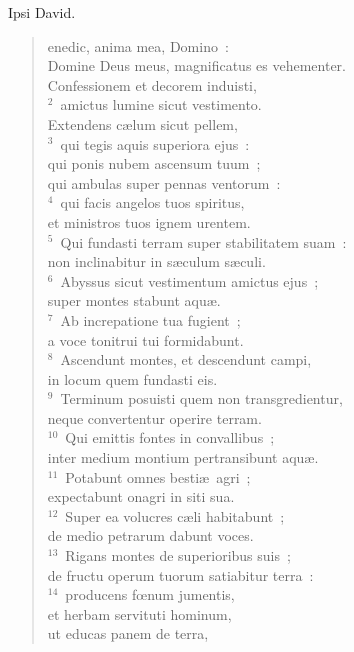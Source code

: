 \bchapter[Psalm]
Ipsi David. \begin{verse}enedic, anima mea, Domino~:\\ Domine Deus meus, magnificatus es vehementer.\\ Confessionem et decorem induisti,\\
${}^{2}$~amictus lumine sicut vestimento.\\ Extendens c\ae lum sicut pellem,\\
${}^{3}$~qui tegis aquis superiora ejus~:\\ qui ponis nubem ascensum tuum~;\\ qui ambulas super pennas ventorum~:\\
${}^{4}$~qui facis angelos tuos spiritus,\\ et ministros tuos ignem urentem.\\
${}^{5}$~Qui fundasti terram super stabilitatem suam~:\\ non inclinabitur in s\ae culum s\ae culi.\\
${}^{6}$~Abyssus sicut vestimentum amictus ejus~;\\ super montes stabunt aqu\ae .\\
${}^{7}$~Ab increpatione tua fugient~;\\ a voce tonitrui tui formidabunt.\\
${}^{8}$~Ascendunt montes, et descendunt campi,\\ in locum quem fundasti eis.\\
${}^{9}$~Terminum posuisti quem non transgredientur,\\ neque convertentur operire terram.\\
${}^{10}$~Qui emittis fontes in convallibus~;\\ inter medium montium pertransibunt aqu\ae .\\
${}^{11}$~Potabunt omnes besti\ae\ agri~;\\ expectabunt onagri in siti sua.\\
${}^{12}$~Super ea volucres c\ae li habitabunt~;\\ de medio petrarum dabunt voces.\\
${}^{13}$~Rigans montes de superioribus suis~;\\ de fructu operum tuorum satiabitur terra~:\\
${}^{14}$~producens fœnum jumentis,\\ et herbam servituti hominum,\\ ut educas panem de terra,\\

\end{verse}
